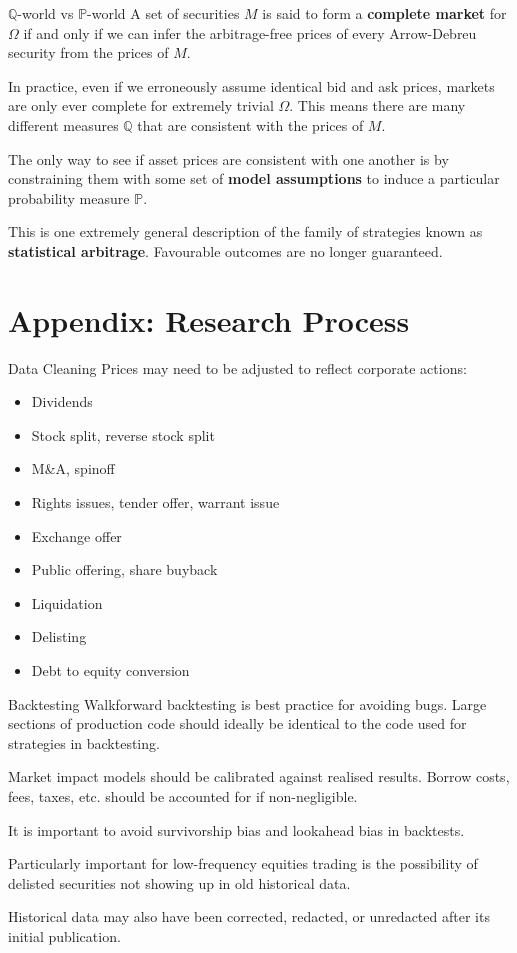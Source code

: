 \documentclass{beamer}
\begin{document}
\begin{frame}{$\mathbb{Q}$-world vs $\mathbb{P}$-world}
	A set of securities $M$ is said to form a \textbf{complete market} for $\Omega$ if and only if we can infer the arbitrage-free prices of every Arrow-Debreu security from the prices of $M$.

	In practice, even if we erroneously assume identical bid and ask prices, markets are only ever complete for extremely trivial $\Omega$. This means there are many different measures $\mathbb{Q}$ that are consistent with the prices of $M$.

	The only way to see if asset prices are consistent with one another is by constraining them with some set of \textbf{model assumptions} to induce a particular probability measure $\mathbb{P}$.

	This is one extremely general description of the family of strategies known as \textbf{statistical arbitrage}. Favourable outcomes are no longer guaranteed.
\end{frame}

\section{Appendix: Research Process}
\begin{frame}{Data Cleaning}
	Prices may need to be adjusted to reflect corporate actions:
	\begin{itemize}
		\item Dividends
		\item Stock split, reverse stock split
		\item M\&A, spinoff
		\item Rights issues, tender offer, warrant issue
		\item Exchange offer
		\item Public offering, share buyback
		\item Liquidation
		\item Delisting
		\item Debt to equity conversion
	\end{itemize}
\end{frame}

\begin{frame}{Backtesting}
	Walkforward backtesting is best practice for avoiding bugs. Large sections of production code should ideally be identical to the code used for strategies in backtesting.

	Market impact models should be calibrated against realised results. Borrow costs, fees, taxes, etc. should be accounted for if non-negligible.

	It is important to avoid survivorship bias and lookahead bias in backtests.

	Particularly important for low-frequency equities trading is the possibility of delisted securities not showing up in old historical data.

	Historical data may also have been corrected, redacted, or unredacted after its initial publication.
\end{frame}
\end{document}
